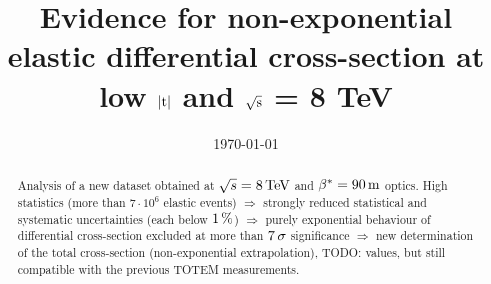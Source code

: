 \documentclass[twocolumn,a4paper,superscriptaddress,preprintnumbers,showpacs,nofootinbib]{revtex4-1}
\def\un#1{\,{\rm #1}}
\begin{document}
\title{Evidence for non-exponential elastic differential cross-section at low $|\hbox{t}|$ and $\sqrt{\hbox{s}}$ = 8 TeV} %

\date{\today}

\noaffiliation




\begin{abstract}
Analysis of a new dataset obtained at $\sqrt{s} = 8\un{TeV}$ and $\beta^* = 90\un{m}$ optics.
High statistics (more than $7\cdot10^{6}$ elastic events)
$\Rightarrow$ strongly reduced statistical and systematic uncertainties (each below $1\un{\%}$) %
$\Rightarrow$ purely exponential behaviour of differential cross-section excluded at more than $7\un{\sigma}$ significance
$\Rightarrow$ new determination of the total cross-section (non-exponential extrapolation), TODO: values, but still compatible
with the previous TOTEM measurements.
\end{abstract}




\maketitle
\end{document}
